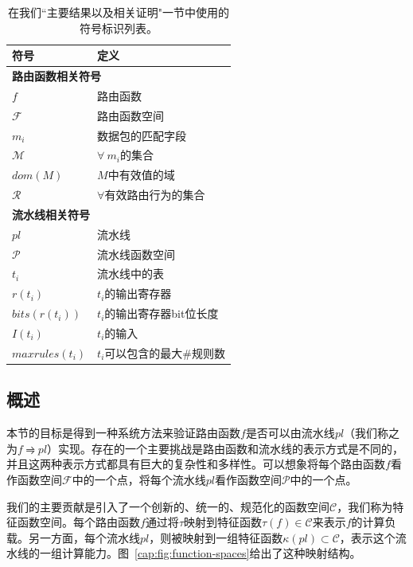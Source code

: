 \documentclass{ctexart}
\begin{document}
\begin{table}
\centering
\begin{tabular}{| l | l |}
  \hline
  \textbf{符号} & \textbf{定义}\\
  \hline
  \hline
  \multicolumn{2}{|l|}{\textbf{路由函数相关符号}} \\
  \hline
  $f$ & 路由函数\\
  $\mathcal{F}$ & 路由函数空间\\
  $m_i$ & 数据包的匹配字段\\
  $\mathcal{M}$ & $\forall\ m_i$的集合\\
  $dom(M)$ &  $M$中有效值的域\\
  $\mathcal{R}$ &  $\forall$有效路由行为的集合\\ 
  \hline
  \hline
  \multicolumn{2}{|l|}{\textbf{流水线相关符号}} \\
  \hline
  $pl$ & 流水线\\
  $\mathcal{P}$ & 流水线函数空间\\
  $t_i$ & 流水线中的表\\
  $r(t_i)$ & $t_i$的输出寄存器\\
  $bits(r(t_i))$ & $t_i$的输出寄存器bit位长度\\
  $I(t_i)$ & $t_i$的输入\\
  $maxrules(t_i)$ & $t_i$可以包含的最大$\#$规则数\\
  \hline
\end{tabular}
\vspace{2mm}
\label{cap:tbl:sym-table}
\caption{在我们``主要结果以及相关证明"一节中使用的符号标识列表。}
\end{table}

\subsection{概述}
本节的目标是得到一种系统方法来验证路由函数$f$是否可以由流水线$pl$（我们称之为$f \rightrightharpoons pl$）实现。存在的一个主要挑战是路由函数和流水线的表示方式是不同的，并且这两种表示方式都具有巨大的复杂性和多样性。可以想象将每个路由函数$f$看作函数空间$\mathcal{F}$中的一个点，将每个流水线$pl$看作函数空间$\mathcal{P}$中的一个点。 

我们的主要贡献是引入了一个创新的、统一的、规范化的函数空间$\mathcal{C}$，我们称为特征函数空间。每个路由函数$f$通过将$\tau$映射到特征函数$\tau(f) \in \mathcal{C}$来表示$f$的计算负载。另一方面，每个流水线$pl$，则被映射到一组特征函数$\kappa(pl) \subset \mathcal{C}$，表示这个流水线的一组计算能力。图~\ref{cap:fig:function-spaces}给出了这种映射结构。
\end{document}
